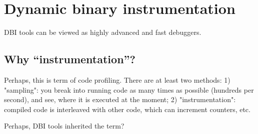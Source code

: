 \chapter{Dynamic binary instrumentation}

\ac{DBI} tools can be viewed as highly advanced and fast debuggers.




\section{Why ``instrumentation''?}

Perhaps, this is term of code profiling.
There are at least two methods:
1) "sampling": you break into running code as many times as possible (hundreds per second), and see, where it is executed at the moment;
2) "instrumentation": compiled code is interleaved with other code, which can increment counters, etc.

Perhaps, \ac{DBI} tools inherited the term?

